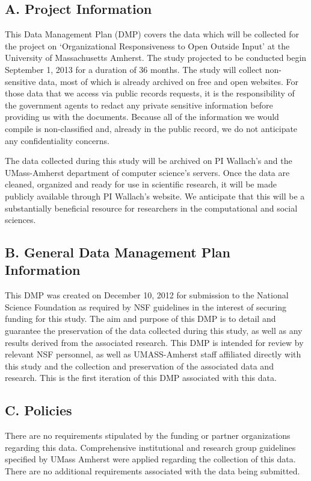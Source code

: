 


\subsection*{A. Project Information}
This Data Management Plan (DMP) covers the data which will be collected for the project on `Organizational Responsiveness to Open Outside Input' at the University of Massachusetts Amherst. The study projected to be conducted begin September 1, 2013 for a duration of 36 months. The study will collect non-sensitive data, most of which is already archived on free and open websites. For those data that we access via public records requests, it is the responsibility of the government agents to redact any private sensitive information before providing us with the documents. Because all of the information we would compile is non-classified and, already in the public record, we do not anticipate any confidentiality concerns. 

 The data collected during this study will be archived on PI Wallach's and the UMass-Amherst department of computer science's servers. Once the data are cleaned, organized and ready for use in scientific research, it will be made publicly available through PI Wallach's website. We anticipate that this will be a substantially beneficial resource for researchers in the computational and social sciences.


\subsection*{B. General Data Management Plan Information }
This DMP was created on December 10, 2012 for submission to the National Science Foundation as
required by NSF guidelines in the interest of securing funding for this study. The aim and purpose of this DMP is to detail and guarantee the preservation of the data collected during this study, as well as any results derived from the associated research. This DMP is intended for review by relevant NSF
personnel, as well as UMASS-Amherst  staff affiliated directly with this study and the collection and preservation of the associated data and research. This is the first iteration of this DMP associated with this data.

\subsection*{C. Policies }
There are no requirements stipulated by the funding or partner organizations regarding this data.
Comprehensive institutional and research group guidelines specified by UMass Amherst were applied regarding the collection of this data. There are no additional requirements associated with the data being submitted.

